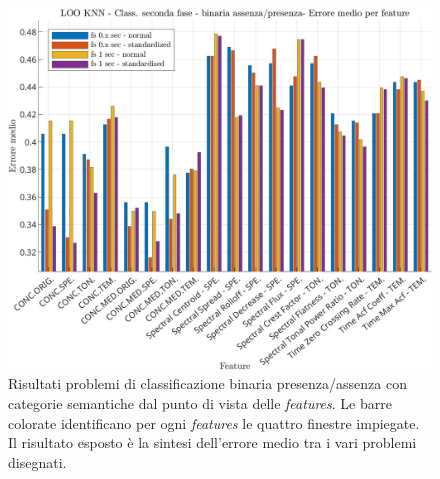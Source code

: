\begin{center}	
	\begin{figure}[htp]
		\centering
		\includegraphics[width=1\textwidth]{img/cap4-classificazione_fase2_features_binaria_presenza.jpg}
		\caption{Risultati problemi di classificazione binaria presenza/assenza con categorie semantiche dal punto
			di vista delle \textit{features}. Le barre colorate identificano per ogni \textit{features} le quattro finestre impiegate. Il risultato
			esposto è la sintesi dell’errore medio tra i vari problemi disegnati.}
		\label{fig4.6}
	\end{figure}
\end{center}
